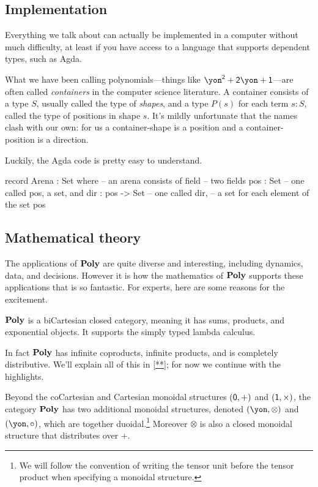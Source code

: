 \documentclass[Book-Poly]{subfiles}
\begin{document}
\subsection{Implementation}

Everything we talk about can actually be implemented in a computer without much difficulty, at least if you have access to a language that supports dependent types, such as Agda.

What we have been calling polynomials---things like $\yon^\2+\2\yon+\1$---are often called \emph{containers} in the computer science literature. A container consists of a type $S$, usually called the type of \emph{shapes}, and a type $P(s)$ for each term $s:S$, called the type of positions in shape $s$. It's mildly unfortunate that the names clash with our own: for us a container-shape is a position and a container-position is a direction.

Luckily, the Agda code is pretty easy to understand.
\begin{agda}
record Arena : Set where  -- an arena consists of 
   field                      -- two fields
     pos : Set                -- one called pos, a set, and
     dir : pos -> Set         -- one called dir,
                              -- a set for each element of the set pos
\end{agda}

\subsection{Mathematical theory}\label{subsec.math_theory}

The applications of $\mathbf{Poly}$ are quite diverse and interesting, including dynamics, data, and decisions. However it is how the mathematics of $\mathbf{Poly}$ supports these applications that is so fantastic. For experts, here are some reasons for the excitement.

\begin{proposition}
$\mathbf{Poly}$ is a biCartesian closed category, meaning it has sums, products, and exponential objects. It supports the simply typed lambda calculus.
\end{proposition}

In fact $\mathbf{Poly}$ has infinite coproducts, infinite products, and is completely distributive. We'll explain all of this in \cref{**}; for now we continue with the highlights.

\begin{proposition}
Beyond the coCartesian and Cartesian monoidal structures $(\textsf{0},+)$ and $(\textsf{1},\times)$, the category $\mathbf{Poly}$ has two additional monoidal structures, denoted $(\yon,\otimes)$ and $(\yon,\circ)$, which are together duoidal.\footnote{We will follow the convention of writing the tensor unit before the tensor product when specifying a monoidal structure.} Moreover $\otimes$ is also a closed monoidal structure that distributes over $+$.
\end{proposition}
\end{document}
